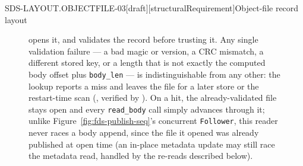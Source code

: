\begin{requirement}{SDS-LAYOUT.OBJECTFILE-03}[draft][structuralRequirement]{Object-file record layout}
\begin{figure}[H]
{    opens it, and validates the record before trusting it. Any single
    validation failure --- a bad magic or version, a CRC mismatch, a
    different stored key, or a length that is not exactly
    the computed body offset plus \texttt{body\_len} --- is indistinguishable
    from any other: the lookup reports a miss and leaves the file for a later
    store or the restart-time scan
    (, verified by
    ). On a hit, the already-validated file
    stays open and every \texttt{read\_body} call simply advances through
    it; unlike Figure~\ref{fig:fds-publish-seq}'s concurrent
    \texttt{Follower}, this reader never races a body append, since the
    file it opened was already published at open time (an in-place
    metadata update may still race the metadata read, handled by the
    re-reads described below).}\label{fig:sds-objectfile-lookup-seq}
  \end{figure}


\end{requirement}
